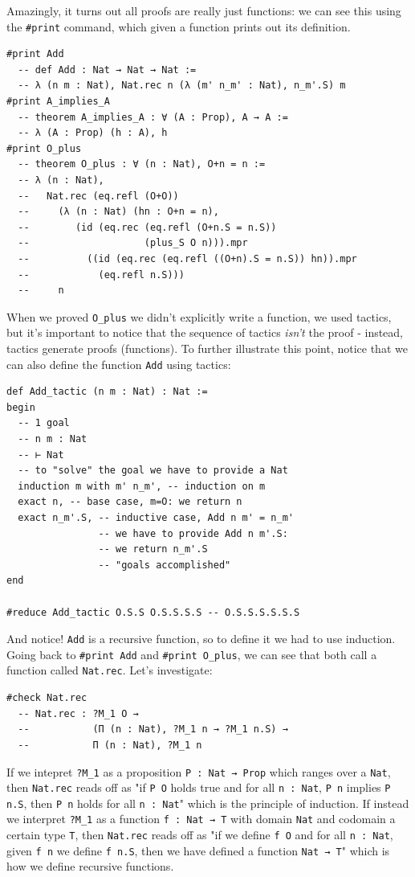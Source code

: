 \documentclass[oneside]{book}
\theoremstyle{definition}
\theoremstyle{remark}
\theoremstyle{plain}
\begin{document}
Amazingly, it turns out all proofs are really just functions: we can see this using the \lstinline{#print} command,
which given a function prints out its definition.
\begin{lstlisting}
#print Add
  -- def Add : Nat → Nat → Nat :=
  -- λ (n m : Nat), Nat.rec n (λ (m' n_m' : Nat), n_m'.S) m
#print A_implies_A
  -- theorem A_implies_A : ∀ (A : Prop), A → A :=
  -- λ (A : Prop) (h : A), h
#print O_plus
  -- theorem O_plus : ∀ (n : Nat), O+n = n :=
  -- λ (n : Nat),
  --   Nat.rec (eq.refl (O+O))
  --     (λ (n : Nat) (hn : O+n = n),
  --        (id (eq.rec (eq.refl (O+n.S = n.S))
  --                    (plus_S O n))).mpr
  --          ((id (eq.rec (eq.refl ((O+n).S = n.S)) hn)).mpr
  --            (eq.refl n.S)))
  --     n
\end{lstlisting}
When we proved \lstinline{O_plus} we didn't explicitly write a function,
we used tactics, but it's important to notice that the sequence of tactics \textit{isn't} the proof -
instead, tactics generate proofs (functions).
To further illustrate this point, notice that we can also define the function \lstinline{Add} using tactics:
\begin{lstlisting}
def Add_tactic (n m : Nat) : Nat :=
begin
  -- 1 goal
  -- n m : Nat
  -- ⊢ Nat
  -- to "solve" the goal we have to provide a Nat
  induction m with m' n_m', -- induction on m
  exact n, -- base case, m=O: we return n
  exact n_m'.S, -- inductive case, Add n m' = n_m'
                -- we have to provide Add n m'.S:
                -- we return n_m'.S
                -- "goals accomplished"
end

#reduce Add_tactic O.S.S O.S.S.S.S -- O.S.S.S.S.S.S
\end{lstlisting}
And notice! \lstinline{Add} is a recursive function, so to define it we had to use induction.
Going back to \lstinline{#print Add} and \lstinline{#print O_plus},
we can see that both call a function called \lstinline{Nat.rec}. Let's investigate:
\begin{lstlisting}
#check Nat.rec
  -- Nat.rec : ?M_1 O →
  --           (Π (n : Nat), ?M_1 n → ?M_1 n.S) →
  --           Π (n : Nat), ?M_1 n
\end{lstlisting}
If we intepret \lstinline{?M_1} as a proposition \lstinline{P : Nat → Prop} which ranges over a \lstinline{Nat},
then \lstinline{Nat.rec} reads off as
"if \lstinline{P O} holds true and for all \lstinline{n : Nat},
\lstinline{P n} implies \lstinline{P n.S}, then \lstinline{P n} holds for all \lstinline{n : Nat}" which is the principle of induction.
If instead we interpret \lstinline{?M_1} as a function \lstinline{f : Nat → T} with domain \lstinline{Nat} and codomain a certain type \lstinline{T},
then \lstinline{Nat.rec} reads off as
"if we define \lstinline{f O} and for all \lstinline{n : Nat},
given \lstinline{f n} we define \lstinline{f n.S}, then we have defined a function \lstinline{Nat → T}" which is how we define recursive functions.
\end{document}
